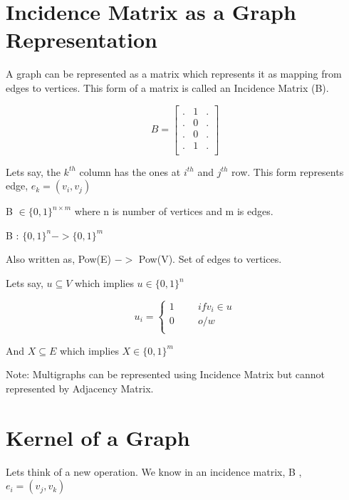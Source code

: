 \documentclass{article}
\begin{document}

    \section{Incidence Matrix as a Graph Representation}
    
    A graph can be represented as a matrix which represents it as mapping from edges to vertices. This form of a matrix is called an Incidence Matrix (B).
    
     $$B =
    \left[ {\begin{array}{cccc}
    	. & 1 & . \\
    	. & 0 & .\\
    	. & 0 & .\\
    	. & 1 & . \\
    	\end{array} } \right]
    $$  
    
    Lets say, the $k^{th}$ column has the ones at $i^{th}$ and $j^{th}$ row. 
    This form represents edge, $e_{k} = ( v_{i},v_{j})$
    
    B $\in \{0,1\}^{n\times m}$ where n is number of vertices and m is edges.
    
    B : $\{0,1\}^n -> \{0,1\}^m$ 
    
    Also written as, Pow(E) $->$ Pow(V).  Set of edges to vertices. 
   
    
    Lets say, $u \subseteq V$ which implies  $u \in \{ 0,1 \}^{n}$ 
    
    $$u_{i} =
    \left\{
    \begin{array}{ll}
    1\hspace{1cm} if  v_i \in u\\
    0\hspace{1cm} o/w\\
    \end{array}
    \right.$$
    
    And $X \subseteq E$ which implies $X \in \{0,1\}^m$
    
    Note: Multigraphs can be represented using Incidence Matrix but cannot represented by Adjacency Matrix.
    
    
    
    \section{Kernel of a Graph}
  	
  	Lets think of a new operation. We know in an incidence matrix, B , $e_{i} = (v_{j},v_{k})$
  	
\end{document}

